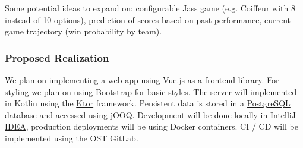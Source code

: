 Some potential ideas to expand on: configurable Jass game (e.g. Coiffeur with 8 instead of 10 options), prediction of scores based on past performance, current game trajectory (win probability by team).

\subsubsection*{Proposed Realization}

We plan on implementing a web app using \href{https://vuejs.org/}{Vue.js} as a frontend library. For styling we plan on using \href{https://getbootstrap.com/}{Bootstrap} for basic styles.
The server will implemented in Kotlin using the \href{https://ktor.io/}{Ktor} framework.
Persistent data is stored in a \href{https://www.postgresql.org/}{PostgreSQL} database and accessed using \href{https://www.jooq.org/}{jOOQ}.
Development will be done locally in \href{https://www.jetbrains.com/idea/}{IntelliJ IDEA}, production deployments will be using Docker containers.
CI / CD will be implemented using the OST GitLab.
